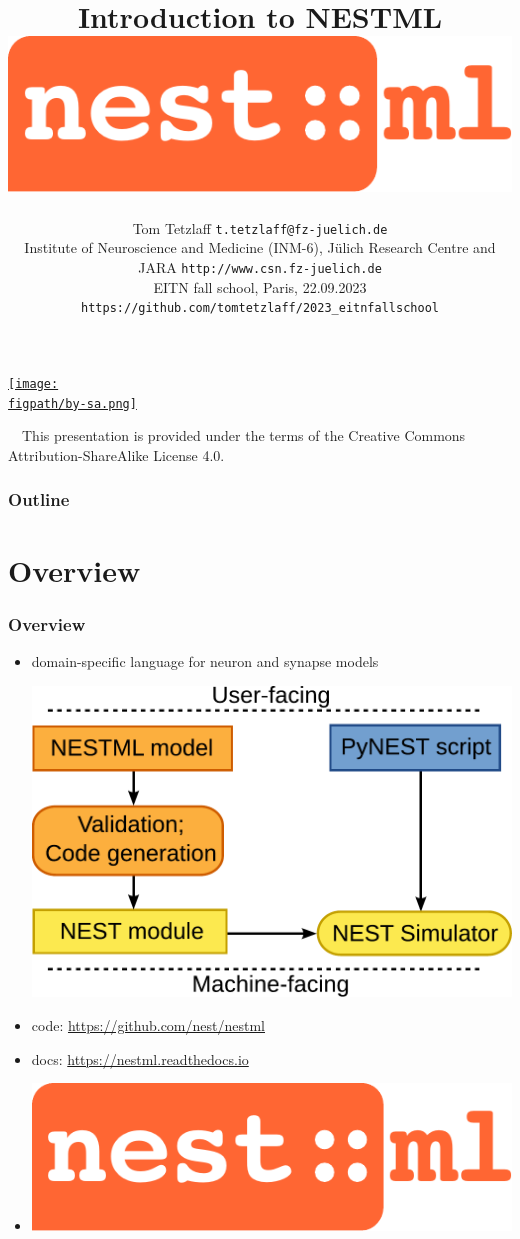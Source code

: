 \documentclass[8pt,t,usepdftitle=false]{beamer}
\title{%
  {\LARGE\bf Introduction to NESTML}
  \hfill\includegraphics[width=0.15\linewidth]{./figures/nestml-logo}\\[1ex]
}
\subtitle{%
  {\normalsize\mdseries Tom Tetzlaff}%
  {\hfill\tiny\texttt{t.tetzlaff@fz-juelich.de}}\\  
  {\footnotesize\mdseries Institute of Neuroscience and Medicine (INM-6), J\"ulich Research Centre and JARA}
  {\hfill\tiny\texttt{http://www.csn.fz-juelich.de}}
  \\
  {\tiny\mdseries EITN fall school, Paris, 22.09.2023}
  {\hfill\tiny\texttt{https://github.com/tomtetzlaff/2023\_eitnfallschool}}
}
\date{}
\author{}
\institute{}
\def\figpath{./figures}
\begin{document}
\maketitle

\begin{frame}[plain]
  \begin{center}
    \parbox{0.9\linewidth}{
      \vspace{0.95\textheight}
      \parbox[c]{0.1\linewidth}{%
        \href{https://creativecommons.org/licenses/by-sa/4.0}{%
          \texttt{[image: \\figpath/by-sa.png]}}}
      \parbox[c]{0.9\linewidth}{\scriptsize%
        ~~{}This presentation is provided under the terms of the Creative Commons Attribution-ShareAlike License 4.0.
      }
    }    
  \end{center}
\end{frame}
\def\ttl{Outline}
\begin{frame}[plain]
  \frametitle{\ttl}
  \tableofcontents
\end{frame}
\def\ttl{Overview}\section{\ttl}
\begin{frame}[t,plain]
  \frametitle{\ttl}
  \begin{itemize}
  \item domain-specific language for neuron and synapse models\\[3ex]    
    \begin{center}
      \includegraphics[width=0.7\linewidth]{./figures/nestml-workflow.pdf}
    \end{center}
    \vspace*{4ex}
  \item code: \url{https://github.com/nest/nestml}
  \item docs: \url{https://nestml.readthedocs.io}
  \item[] \vspace*{-5ex}\hfill\includegraphics[width=0.2\linewidth]{./figures/nestml-logo.pdf}
  \end{itemize}
\end{frame}
\end{document}
